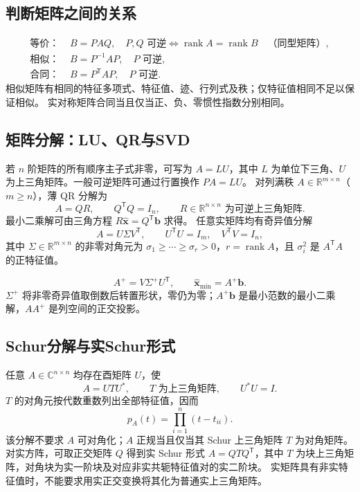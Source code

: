 \documentclass[../main.tex]{subfiles}
\begin{document}
\subsection{判断矩阵之间的关系}
\begin{align*}
\text{等价： }&B=PAQ,\quad P,Q\text{ 可逆}\iff\operatorname{rank}A=\operatorname{rank}B
\quad\text{（同型矩阵）},\\
\text{相似： }&B=P^{-1}AP,\quad P\text{ 可逆},\\
\text{合同： }&B=P^{\mathsf T}AP,\quad P\text{ 可逆}.
\end{align*}
相似矩阵有相同的特征多项式、特征值、迹、行列式及秩；仅特征值相同不足以保证相似。
实对称矩阵合同当且仅当正、负、零惯性指数分别相同。
\subsection{矩阵分解：LU、QR与SVD}
若 $n$ 阶矩阵的所有顺序主子式非零，可写为 $A=LU$，其中 $L$ 为单位下三角、$U$ 为上三角矩阵。一般可逆矩阵可通过行置换作 $PA=LU$。
对列满秩 $A\in\mathbb R^{m\times n}$（$m\ge n$），薄 QR 分解为
\[
A=QR,\qquad Q^{\mathsf T}Q=I_n,\qquad R\in\mathbb R^{n\times n}\text{ 为可逆上三角矩阵}.
\]
最小二乘解可由三角方程 $R\widehat{\bm x}=Q^{\mathsf T}\bm b$ 求得。
任意实矩阵均有奇异值分解
\[
A=U\Sigma V^{\mathsf T},\qquad U^{\mathsf T}U=I_m,\quad V^{\mathsf T}V=I_n,
\]
其中 $\Sigma\in\mathbb R^{m\times n}$ 的非零对角元为 $\sigma_1\ge\cdots\ge\sigma_r>0$，$r=\operatorname{rank}A$，且 $\sigma_i^2$ 是 $A^{\mathsf T}A$ 的正特征值。
\par\pagebreak[0]\begin{samepage}
\[
A^+=V\Sigma^+U^{\mathsf T},\qquad \widehat{\bm x}_{\min}=A^+\bm b.
\]
$\Sigma^+$ 将非零奇异值取倒数后转置形状，零仍为零；$A^+\bm b$ 是最小范数的最小二乘解，$AA^+$ 是列空间的正交投影。
\par\end{samepage}\pagebreak[0]
\subsection{Schur分解与实Schur形式}
任意 $A\in\mathbb C^{n\times n}$ 均存在酉矩阵 $U$，使
\[
A=UTU^*,\qquad T\text{ 为上三角矩阵},\qquad U^*U=I.
\]
$T$ 的对角元按代数重数列出全部特征值，因而
\[
p_A(t)=\prod_{i=1}^n(t-t_{ii}).
\]
该分解不要求 $A$ 可对角化；$A$ 正规当且仅当其 Schur 上三角矩阵 $T$ 为对角矩阵。
对实方阵，可取正交矩阵 $Q$ 得到实 Schur 形式 $A=QTQ^{\mathsf T}$，其中 $T$ 为块上三角矩阵，对角块为实一阶块及对应非实共轭特征值对的实二阶块。
实矩阵具有非实特征值时，不能要求用实正交变换将其化为普通实上三角矩阵。
\end{document}
